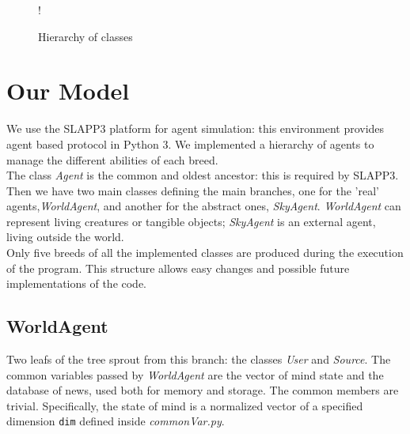\begin{figure}
  \begin{center}
     {!} {
    }
  \end{center}
  \caption{Hierarchy of classes}
  \label{fig:hierarchy}
\end{figure}
\section{Our Model}\label{sec:model}
We use the SLAPP3 platform for agent simulation: this environment provides agent
based protocol in Python 3.
We implemented a hierarchy of agents to manage the different abilities of
each breed.
\\
The class \textit{Agent} is the common and oldest ancestor:
this is required by SLAPP3.\\
Then we have two main classes defining the main branches,
one for the 'real' agents,\textit{WorldAgent}, and another for
the abstract ones, \textit{SkyAgent}.
\textit{WorldAgent} can represent living creatures or tangible objects;
\textit{SkyAgent} is an external agent, living outside the world.\\
Only five breeds of all the implemented classes are produced during
the execution of the program.
This structure allows easy changes and possible future implementations
of the code.

\subsection{WorldAgent}\label{subsec:worldagent}
Two leafs of the tree sprout from this branch: the classes \textit{User}
and \textit{Source}.
The common variables passed by \textit{WorldAgent} are
the vector of mind state and the database of news, used both for memory
and storage. The common members are trivial.
Specifically, the state of mind is a normalized vector of a
specified dimension \texttt{dim} defined inside
\textit{commonVar.py}.

